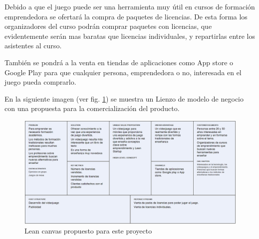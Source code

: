 Debido a que el juego puede ser una herramienta muy útil en cursos de formación emprendedora se ofertará la compra de paquetes de licencias. De esta forma los organizadores del curso podrán comprar paquetes con licencias, que evidentemente serán mas baratas que licencias individuales, y repartirlas entre los asistentes al curso. 

También se pondrá a la venta en tiendas de aplicaciones como App store o Google Play para que cualquier persona, emprendedora o no,  interesada en el juego pueda comprarlo.

En la siguiente imagen (ver fig. \ref{leanCanvasDaVinci})  se muestra un Lienzo de modelo de negocio con una propuesta para la comercialización del producto.

\begin{figure}
\begin{center}
\includegraphics[scale=0.3]{imagenes/leanCanvasDaVinciStartup.png}
\caption{Lean canvas propuesto para este proyecto}
\label{leanCanvasDaVinci}
\end{center}
\end{figure}




